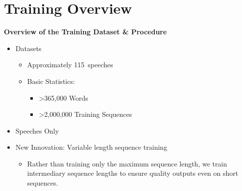 \documentclass[10pt,aspectratio=169]{beamer}
\begin{document}
  \section{Training Overview}
  \begin{frame}{\textbf{Overview of the Training Dataset \& Procedure}}

  \begin{itemize}
    \item Datasets
    \begin{itemize}
      \item Approximately 115~speeches
      \item Basic Statistics:
      \begin{itemize}
        \item >365,000 Words
        \item >2,000,000 Training Sequences
      \end{itemize}
    \end{itemize}
    \vfill
    \item Speeches Only
    \vfill
    \item New Innovation: Variable length sequence training
    \begin{itemize}
      \item Rather than training only the maximum sequence length, we train intermediary sequence lengths to ensure quality outputs even on short sequences.
    \end{itemize}
  \end{itemize}

  
  \end{frame}
  
  
\end{document}
